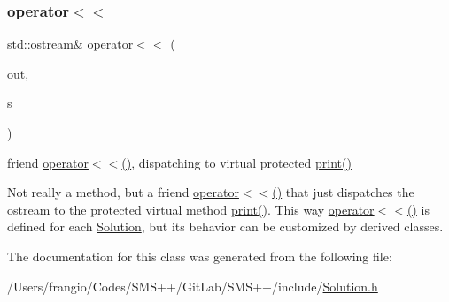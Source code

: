 \subsubsection{\texorpdfstring{operator$<$$<$}{operator<<}}
{\footnotesize\ttfamily std\+::ostream\& operator$<$$<$ (\begin{DoxyParamCaption}\item[{std\+::ostream \&}]{out,  }\item[{const \mbox{\hyperlink{class_s_m_spp__di__unipi__it_1_1_solution}{Solution}} \&}]{s }\end{DoxyParamCaption})\hspace{0.3cm}{\ttfamily [friend]}}



friend \mbox{\hyperlink{class_s_m_spp__di__unipi__it_1_1_solution_a1963158e39c1643e92996ee932626aab}{operator$<$$<$()}}, dispatching to virtual protected \mbox{\hyperlink{class_s_m_spp__di__unipi__it_1_1_solution_a2e7b9c9148a98c5c342e8c25cac95926}{print()}} 

Not really a method, but a friend \mbox{\hyperlink{class_s_m_spp__di__unipi__it_1_1_solution_a1963158e39c1643e92996ee932626aab}{operator$<$$<$()}} that just dispatches the ostream to the protected virtual method \mbox{\hyperlink{class_s_m_spp__di__unipi__it_1_1_solution_a2e7b9c9148a98c5c342e8c25cac95926}{print()}}. This way \mbox{\hyperlink{class_s_m_spp__di__unipi__it_1_1_solution_a1963158e39c1643e92996ee932626aab}{operator$<$$<$()}} is defined for each \mbox{\hyperlink{class_s_m_spp__di__unipi__it_1_1_solution}{Solution}}, but its behavior can be customized by derived classes. 

The documentation for this class was generated from the following file\+:\begin{DoxyCompactItemize}
\item 
/\+Users/frangio/\+Codes/\+S\+M\+S++/\+Git\+Lab/\+S\+M\+S++/include/\mbox{\hyperlink{_solution_8h}{Solution.\+h}}\end{DoxyCompactItemize}

